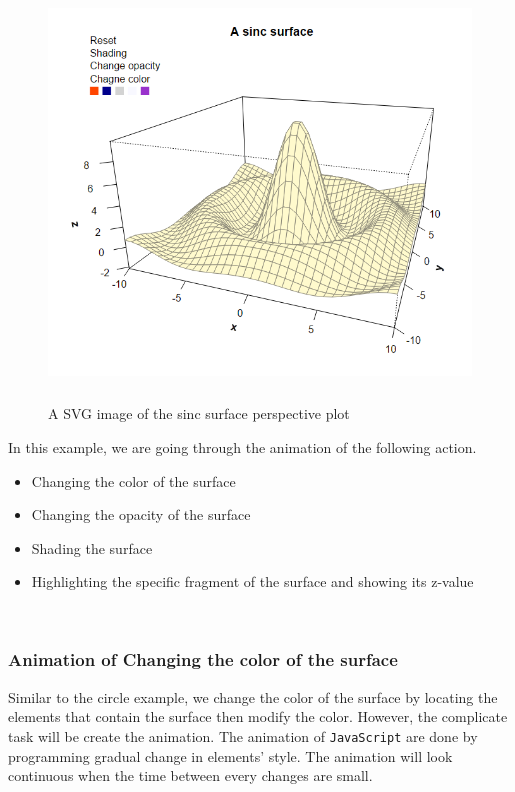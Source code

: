 \documentclass[paper=a4, fontsize=11pt]{report}
\begin{document}
\begin{figure}[h]
	\begin{center}
		\includegraphics[height = 11cm, width = 13cm]{figure/svg/origin_1.PNG}
		\caption{A SVG image of the sinc surface perspective plot}
		\label{Example_6.3.01}
	\end{center}
\end{figure}




In this example, we are going through the animation of the following action.
\begin{itemize}
	\item Changing the color of the surface
	\item Changing the opacity of the surface
	\item Shading the surface
	\item Highlighting the specific fragment of the surface and showing its z-value  
\end{itemize}
\\

\subsubsection*{Animation of Changing the color of the surface}
Similar to the circle example, we change the color of the surface by locating the elements that contain the surface then modify the color. However, the complicate task will be create the animation. The animation of \texttt{JavaScript} are done by programming gradual change in elements' style. The animation will look continuous when the time between every changes are small.\\
\end{document}
